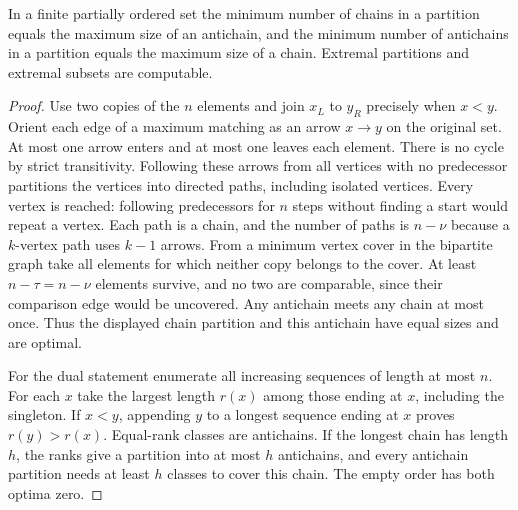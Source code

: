\begin{theorem}\leavevmode\label{fl:poset}
In a finite partially ordered set the minimum number of chains in a
partition equals the maximum size of an antichain, and the minimum
number of antichains in a partition equals the maximum size of a
chain. Extremal partitions and extremal subsets are computable.
\end{theorem}
\begin{proof}
Use two copies of the $n$ elements and join $x_L$ to $y_R$ precisely
when $x<y$. Orient each edge of a maximum matching as an arrow $x\to y$
on the original set. At most one arrow enters and at most one leaves
each element. There is no cycle by strict transitivity. Following
these arrows from all vertices with no predecessor partitions the
vertices into directed paths, including isolated vertices. Every
vertex is reached: following predecessors for $n$ steps without
finding a start would repeat a vertex. Each path is a chain, and the
number of paths is $n-\nu$ because a $k$-vertex path uses $k-1$
arrows. From a minimum vertex cover in the bipartite graph take all
elements for which neither copy belongs to the cover. At least
$n-\tau=n-\nu$ elements survive, and no two are comparable,
since their comparison edge would be uncovered. Any antichain meets
any chain at most once. Thus the displayed chain partition and this
antichain have equal sizes and are optimal.

For the dual statement enumerate all increasing sequences of length
at most $n$. For each $x$ take the largest length $r(x)$ among those
ending at $x$, including the singleton. If $x<y$, appending $y$
to a longest sequence ending at $x$ proves $r(y)>r(x)$. Equal-rank
classes are antichains. If the longest chain has length $h$, the
ranks give a partition into at most $h$ antichains, and every
antichain partition needs at least $h$ classes to cover this chain.
The empty order has both optima zero.
\end{proof}

